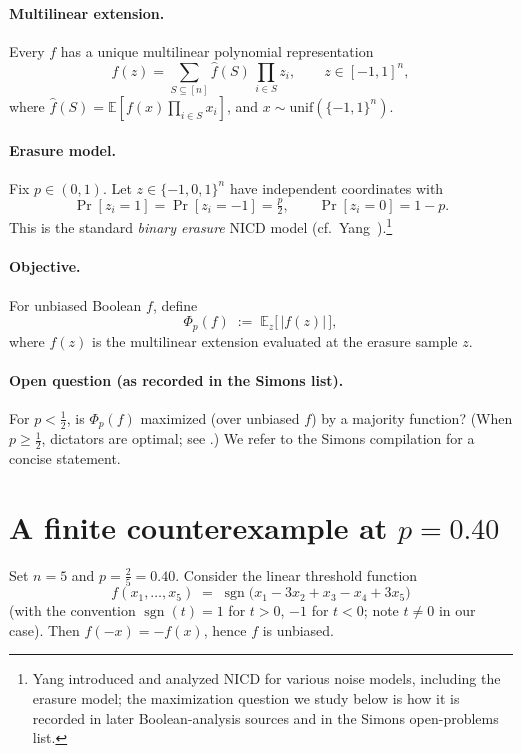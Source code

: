 \documentclass[11pt]{article}
\DeclareMathOperator{\sgn}{sgn}
\begin{document}
\paragraph{Multilinear extension.}
Every \(f\) has a unique multilinear polynomial representation
\[
f(z)=\sum_{S\subseteq[n]}\widehat f(S)\,\prod_{i\in S} z_i, \qquad z\in[-1,1]^n,
\]
where \(\widehat f(S)=\mathbb{E}[f(x)\prod_{i\in S}x_i]\), and \(x \sim \mathrm{unif}(\{-1,1\}^{n})\).

\paragraph{Erasure model.}
Fix \(p\in(0,1)\). Let \(z\in\{-1,0,1\}^n\) have independent coordinates with
\[
\Pr[z_i=1]=\Pr[z_i=-1]=\tfrac{p}{2}, \qquad \Pr[z_i=0]=1-p.
\]
This is the standard \emph{binary erasure} NICD model (cf.\ Yang~\cite{Yang2007}).\footnote{Yang introduced and analyzed NICD for various noise models, including the erasure model; the maximization question we study below is how it is recorded in later Boolean-analysis sources and in the Simons open-problems list.}

\paragraph{Objective.}
For unbiased Boolean \(f\), define
\[
\Phi_p(f)\;:=\;\mathbb{E}_{z}\big[\,|f(z)|\,\big],
\]
where \(f(z)\) is the multilinear extension evaluated at the erasure sample \(z\).

\paragraph{Open question (as recorded in the Simons list).}
For \(p<\tfrac12\), is \(\Phi_p(f)\) maximized (over unbiased \(f\)) by a majority function? (When \(p\ge \tfrac12\), dictators are optimal; see \cite{ODWright2012,ODonnellOP}.) We refer to the Simons compilation \cite{SimonsOpen} for a concise statement.

\section{A finite counterexample at \texorpdfstring{$p=0.40$}{p=0.40}}
Set \(n=5\) and \(p=\frac{2}{5}=0.40\).
Consider the linear threshold function
\[
f(x_1,\ldots,x_5)\;=\;\sgn\!\big(x_1-3x_2+x_3-x_4+3x_5\big)
\]
(with the convention \(\sgn(t)=1\) for \(t>0\), \(-1\) for \(t<0\); note \(t\neq 0\) in our case).
Then \(f(-x)=-f(x)\), hence \(f\) is unbiased.
\end{document}

